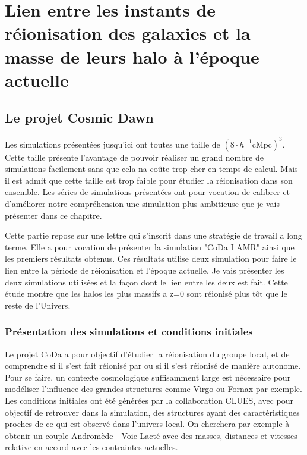 \chapter{Lien entre les instants de réionisation des galaxies et la masse de leurs halo à l'époque actuelle}

\section{Le projet Cosmic Dawn}
\label{sec:CODAEMMA}

Les simulations présentées jusqu'ici ont toutes une taille de $\left( 8\cdot h^{-1} \mathrm{cMpc} \right)^3$.
Cette taille présente l'avantage de pouvoir réaliser un grand nombre de simulations facilement sans que cela na coûte trop cher en temps de calcul.
Mais il est admit que cette taille est trop faible pour étudier la réionisation dans son ensemble.
Les séries de simulations présentées ont pour vocation de calibrer et d'améliorer notre compréhension une simulation plus ambitieuse que je vais présenter dans ce chapitre.



Cette partie repose sur une lettre qui s'inscrit dans une stratégie de travail a long terme.
Elle a pour vocation de présenter la simulation "\ac{CoDa} I AMR" ainsi que les premiers résultats obtenus.
Ces résultats utilise deux simulation pour faire le lien entre la période de réionisation et l’époque actuelle.
Je vais présenter les deux simulations utilisées et la façon dont le lien entre les deux est fait.
Cette étude montre que les halos les plus massifs a z=0 sont réionisé plus tôt que le reste de l'Univers.



\subsection{Présentation des simulations et conditions initiales}

Le projet \ac{CoDa} a pour objectif d'étudier la réionisation du groupe local, et de comprendre si il s'est fait réionisé par  ou si il s'est réionisé de manière autonome.
Pour se faire, un contexte cosmologique suffisamment large est nécessaire pour modéliser l'influence des grandes structures comme Virgo ou Fornax par exemple.
Les conditions initiales ont été générées par la collaboration \ac{CLUES}, avec pour objectif de retrouver dans la simulation, des structures ayant des caractéristiques proches de ce qui est observé dans l'univers local.
On cherchera par exemple à obtenir un couple Andromède - Voie Lacté avec des masses, distances et vitesses relative en accord avec les contraintes actuelles.


